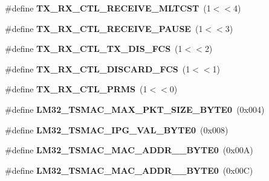 \begin{DoxyCompactItemize}
\item 
\mbox{\label{group__lm32__tsmac_ga4c52e39ec16b04272afbf01c03d49a54}} 
\#define {\bfseries T\+X\+\_\+\+R\+X\+\_\+\+C\+T\+L\+\_\+\+R\+E\+C\+E\+I\+V\+E\+\_\+\+M\+L\+T\+C\+ST}~(1$<$$<$4)
\item 
\mbox{\label{group__lm32__tsmac_gaca1609e826d2166697f729eba086adfb}} 
\#define {\bfseries T\+X\+\_\+\+R\+X\+\_\+\+C\+T\+L\+\_\+\+R\+E\+C\+E\+I\+V\+E\+\_\+\+P\+A\+U\+SE}~(1$<$$<$3)
\item 
\mbox{\label{group__lm32__tsmac_ga5312533a553c44457f04578ad49cfd1e}} 
\#define {\bfseries T\+X\+\_\+\+R\+X\+\_\+\+C\+T\+L\+\_\+\+T\+X\+\_\+\+D\+I\+S\+\_\+\+F\+CS}~(1$<$$<$2)
\item 
\mbox{\label{group__lm32__tsmac_ga049c99bad2fb3cad3179b2041ba781e1}} 
\#define {\bfseries T\+X\+\_\+\+R\+X\+\_\+\+C\+T\+L\+\_\+\+D\+I\+S\+C\+A\+R\+D\+\_\+\+F\+CS}~(1$<$$<$1)
\item 
\mbox{\label{group__lm32__tsmac_ga97f0286770a26b759b33441c66d8c474}} 
\#define {\bfseries T\+X\+\_\+\+R\+X\+\_\+\+C\+T\+L\+\_\+\+P\+R\+MS}~(1$<$$<$0)
\item 
\mbox{\label{group__lm32__tsmac_ga812a950b3b1d38ea33638c894c21961e}} 
\#define {\bfseries L\+M32\+\_\+\+T\+S\+M\+A\+C\+\_\+\+M\+A\+X\+\_\+\+P\+K\+T\+\_\+\+S\+I\+Z\+E\+\_\+\+B\+Y\+T\+E0}~(0x004)
\item 
\mbox{\label{group__lm32__tsmac_ga5b718cfbb5d3b1050d46d984bc7c0697}} 
\#define {\bfseries L\+M32\+\_\+\+T\+S\+M\+A\+C\+\_\+\+I\+P\+G\+\_\+\+V\+A\+L\+\_\+\+B\+Y\+T\+E0}~(0x008)
\item 
\mbox{\label{group__lm32__tsmac_gac6efff6d118dc79d8985e492cbf6ab13}} 
\#define {\bfseries L\+M32\+\_\+\+T\+S\+M\+A\+C\+\_\+\+M\+A\+C\+\_\+\+A\+D\+D\+R\+\_\+\_\+\+B\+Y\+T\+E0}~(0x00\+A)
\item 
\mbox{\label{group__lm32__tsmac_ga434965e95b0a21d19140ae4b07fc7da8}} 
\#define {\bfseries L\+M32\+\_\+\+T\+S\+M\+A\+C\+\_\+\+M\+A\+C\+\_\+\+A\+D\+D\+R\+\_\+\_\+\+B\+Y\+T\+E0}~(0x00\+C)
$$
\end{DoxyCompactItemize}
